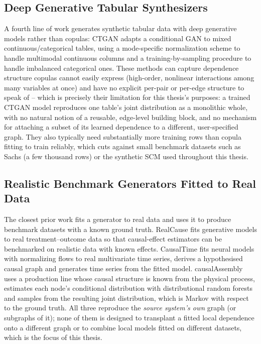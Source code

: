\documentclass[
  english,
  class=report,
  accentcolor=2c,
  marginpar=false,
  parskip=half-,
  fontsize=11pt,
  ruledheaders=false,
  pdfa=false,
  IMRAD=false,
  thesis={type=master}
]{tudapub}
\begin{document}
\subsection{Deep Generative Tabular Synthesizers}
A fourth line of work generates synthetic tabular data with deep generative
models rather than copulas: CTGAN \parencite{xu2019} adapts a conditional
GAN to mixed continuous/categorical tables, using a mode-specific
normalization scheme to handle multimodal continuous columns and a
training-by-sampling procedure to handle imbalanced categorical ones. These
methods can capture dependence structure copulas cannot easily express
(high-order, nonlinear interactions among many variables at once) and have
no explicit per-pair or per-edge structure to speak of -- which is
precisely their limitation for this thesis's purposes: a trained CTGAN
model reproduces one table's joint distribution as a monolithic whole, with
no natural notion of a reusable, edge-level building block, and no
mechanism for attaching a subset of its learned dependence to a different,
user-specified graph. They also typically need substantially more training
rows than copula fitting to train reliably, which cuts against small
benchmark datasets such as Sachs (a few thousand rows) or the synthetic
SCM used throughout this thesis.

\subsection{Realistic Benchmark Generators Fitted to Real Data}
\label{sec:realistic-generators}
The closest prior work fits a generator to real data and uses it to produce
benchmark datasets with a known ground truth. RealCause
\parencite{neal2020} fits generative models to real treatment--outcome data
so that causal-effect estimators can be benchmarked on realistic data with
known effects. CausalTime \parencite{cheng2024} fits neural models with
normalizing flows to real multivariate time series, derives a hypothesised
causal graph and generates time series from the fitted model.
causalAssembly \parencite{goebler2024} uses a production line whose causal
structure is known from the physical process, estimates each node's
conditional distribution with distributional random forests and samples
from the resulting joint distribution, which is Markov with respect to the
ground truth. All three reproduce the \emph{source system's own} graph (or
subgraphs of it); none of them is designed to transplant a fitted local
dependence onto a different graph or to combine local models fitted on
different datasets, which is the focus of this thesis.
\end{document}
